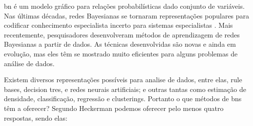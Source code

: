 
\gls{bn} é um modelo gráfico para relações probabilísticas dado conjunto de variáveis. Nas últimas décadas, redes Bayesianas se tornaram representações populares para codificar conhecimento especialista incerto para sistemas especialistas \cite{heck95}. Mais recentemente, pesquisadores desenvolveram métodos de aprendizagem de redes Bayesianas a partir de dados. As técnicas desenvolvidas são novas e ainda em evolução, mas eles têm se mostrado muito eficientes para alguns problemas de análise de dados.

Existem diversos representações possíveis para analise de dados, entre elas, rule bases, decision tres, e redes neurais artificiais; e outras tantas como estimação de densidade, classificação, regressão e clusterings. Portanto o que métodos de \glspl{bn} têm a oferecer? Segundo Heckerman \cite{heck95} podemos oferecer pelo menos quatro respostas, sendo elas:

